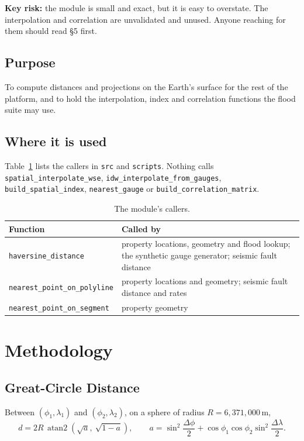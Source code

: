 \documentclass[11pt,a4paper]{article}
\begin{document}
\textbf{Key risk:} the module is small and exact, but it is easy to overstate. The
interpolation and correlation are unvalidated and unused. Anyone reaching for them should
read \S5 first.

\mkmpurpose

\subsection{Purpose}
To compute distances and projections on the Earth's surface for the rest of the platform,
and to hold the interpolation, index and correlation functions the flood suite may use.

\subsection{Where it is used}
Table~\ref{tab:users} lists the callers in \texttt{src} and \texttt{scripts}. Nothing
calls \texttt{spatial\_interpolate\_wse}, \texttt{idw\_interpolate\_from\_gauges},
\texttt{build\_spatial\_index}, \texttt{nearest\_gauge} or
\texttt{build\_correlation\_matrix}.

\begin{table}[H]
\centering\small
\caption{The module's callers.}\label{tab:users}
\begin{tabular}{lp{95mm}}
\toprule
\textbf{Function} & \textbf{Called by} \\
\midrule
\texttt{haversine\_distance} & property locations, geometry and flood lookup; the synthetic
gauge generator; seismic fault distance \\
\texttt{nearest\_point\_on\_polyline} & property locations and geometry; seismic fault
distance and rates \\
\texttt{nearest\_point\_on\_segment} & property geometry \\
\bottomrule
\end{tabular}
\end{table}

\section{Methodology}

\subsection{Great-Circle Distance}
Between $(\phi_1,\lambda_1)$ and $(\phi_2,\lambda_2)$, on a sphere of radius
$R=6{,}371{,}000$\,m,
\begin{equation}
    d = 2R\,\operatorname{atan2}\!\left(\sqrt{a},\ \sqrt{1-a}\right),\qquad
    a = \sin^2\frac{\Delta\phi}{2} + \cos\phi_1\cos\phi_2\sin^2\frac{\Delta\lambda}{2}.
    \label{eq:haversine}
\end{equation}
\end{document}
